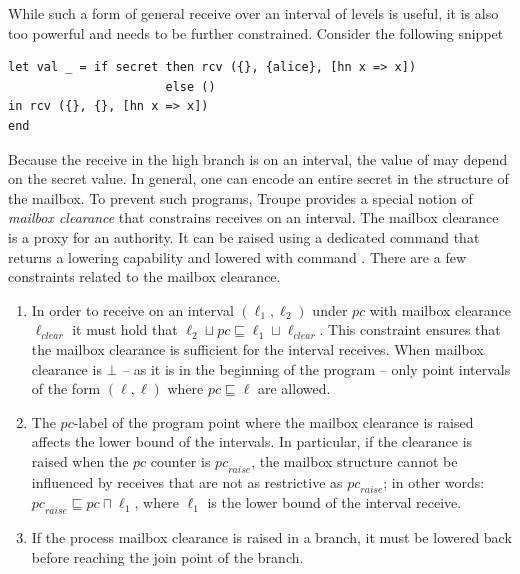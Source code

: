 While such a form of general receive over an interval of levels is useful, it is also too powerful 
and needs to be further constrained. Consider the following snippet


\begin{lstlisting}
let val _ = if secret then rcv ({}, {alice}, [hn x => x])
                      else ()
in rcv ({}, {}, [hn x => x])
end
\end{lstlisting}

Because the receive in the high branch is on an interval, the value of  may 
depend on the secret value. In general, one can encode an entire secret in the structure 
of the mailbox. To prevent such programs, Troupe provides a special notion of \emph{mailbox clearance}
that constrains receives on an interval. The mailbox clearance is a proxy for an authority. 
It can be raised using a dedicated command  that returns a lowering
capability and lowered with command . 
There are a few constraints related to the mailbox clearance.

\begin{enumerate}
    \item In order to receive on an interval $(\ell_1, \ell_2)$ under $\mathit{pc}$ 
    with mailbox clearance $\ell_{\mathit{clear}}$ it must hold that $\ell_2 \sqcup \mathit{pc} \sqsubseteq \ell_1 \sqcup \ell_{\mathit{clear}}$. 
    This constraint ensures that the mailbox clearance is sufficient for the interval receives. When mailbox clearance is $\bot$ -- as it is in the beginning of the program -- only point intervals of the form $(\ell, \ell)$ where $\mathit{pc} \sqsubseteq \ell$ are allowed.

    \item The $\mathit{pc}$-label of the program point where the mailbox clearance is raised affects the lower bound of the intervals. In particular, if the clearance is raised when the $\mathit{pc}$ counter is $\mathit{pc}_{\mathit{raise}}$, the mailbox structure cannot be influenced by receives that are not as restrictive as $\mathit{pc}_{\mathit{raise}}$; in other words: $ \mathit{pc}_\mathit{raise} \sqsubseteq \mathit{pc} \sqcap \ell_1$, where $\ell_1$ is the lower bound of the interval receive. 
    \item If the process mailbox clearance is raised in a branch, it must be lowered back before reaching the join point of the branch.
\end{enumerate}





